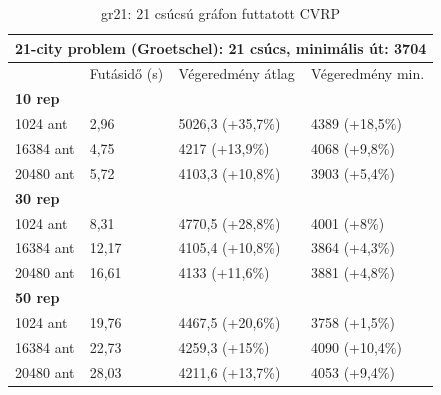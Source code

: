 \begin{table}[ht!]
	\centering
	\begin{tabular}{|p{2cm}||p{3cm}|p{3.5cm}|p{3.5cm}|}
		\hline
		\multicolumn{4}{|c|}{21-city problem (Groetschel): 21 csúcs, minimális út: 3704} \\
		\hline
		& Futásidő (s) & Végeredmény átlag & Végeredmény min.\\
		\hline
		\textbf{10 rep} & & & \\
		1024 ant & 2,96 & 5026,3 (+35,7\%) & 4389 (+18,5\%) \\
		16384 ant & 4,75 & 4217 (+13,9\%) & 4068 (+9,8\%) \\
		20480 ant & 5,72 & 4103,3 (+10,8\%) & 3903 (+5,4\%) \\
		\hline
		\textbf{30 rep} & & & \\
		1024 ant & 8,31 & 4770,5 (+28,8\%) & 4001 (+8\%) \\
		16384 ant & 12,17 & 4105,4 (+10,8\%)& 3864 (+4,3\%) \\
		20480 ant & 16,61 & 4133 (+11,6\%)& 3881 (+4,8\%) \\
		\hline
		\textbf{50 rep} & & & \\
		1024 ant & 19,76 & 4467,5 (+20,6\%)& 3758 (+1,5\%)\\
		16384 ant & 22,73 & 4259,3 (+15\%) & 4090 (+10,4\%)\\
		20480 ant & 28,03 & 4211,6 (+13,7\%)& 4053 (+9,4\%)\\
		\hline
	\end{tabular}
	\caption{gr21: 21 csúcsú gráfon futtatott CVRP}
	\label{table:CVRP_gr21}
\end{table}

